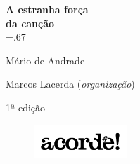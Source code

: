 




\begingroup\thispagestyle{empty}\vspace*{-.01\textheight}\parindent=0pt 
              \formular
              \huge 
              \textbf{A estranha força\\da canção}\\\baselineskip=.67\baselineskip 

              \medskip
              
              \LARGE
              Mário de Andrade
              
              \vspace{4cm}              

              \newfontfamily{}
              {\selectfont\minion\small Marcos Lacerda (\textit{organização})}
              
              \vspace{0.5cm}

              {\selectfont\minion\footnotesize
              1ª edição}
                    
              \vfill
              
              \begin{figure}
              \vspace*{-1.22\baselineskip}
              \includegraphics[width=3.5cm]{./logoacorde.png}
              \end{figure}

